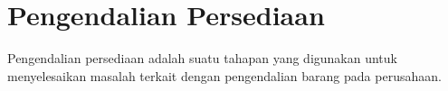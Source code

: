









\section{Pengendalian Persediaan}

Pengendalian persediaan adalah suatu tahapan yang digunakan untuk menyelesaikan masalah terkait dengan pengendalian barang pada perusahaan.


